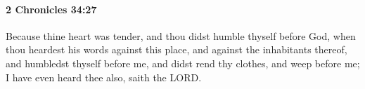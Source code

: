 
		\paragraph{2 Chronicles 34:27} %
			\label{2CHRONICLES-34-27}

			Because thine heart was tender, and thou didst humble thyself before God, when thou heardest his words against this place, and against the inhabitants thereof, and humbledst thyself before me, and didst rend thy clothes, and weep before me; I have even heard thee also, saith the LORD.


